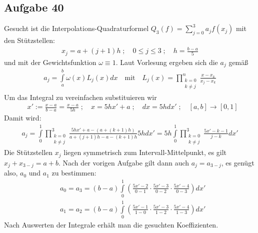 \subsection*{Aufgabe 40}
Gesucht ist die Interpolations-Quadraturformel $Q_3(f) = \sum_{j=0}^3 a_j f(x_j)$
mit den Stützstellen:
\begin{align*}
  x_j = a + (j + 1) h\;;\quad 0 \le j \le 3 \;;\quad h = \frac{b-a}{5}
\end{align*}
und mit der Gewichtsfunktion $\omega \equiv 1$. Laut Vorlesung ergeben sich die $a_j$ gemäß
\begin{align*}
  a_j = \int \limits_a^b \omega(x) L_j(x) dx \quad \text{mit} \quad
 L_j(x) = \prod_{\substack{k = 0 \\k \neq j}}^n \frac{x - x_k}{x_j - x_k}
\end{align*}
Um das Integral zu vereinfachen substituieren wir
\begin{align*}
  & x' := \frac{x - a}{b - a} = \frac{x - a}{5 h} \;;\quad x = 5 h x' + a \;;\quad dx = 5 h dx' \;;\quad
  [a,b] \rightarrow [0,1]
\end{align*}
Damit wird:
\begin{align*}
  a_j = \int \limits_0^1 \prod_{\substack{k = 0 \\k \neq j}}^3
  \frac{5 h x' + a - (a + (k+1) h)}{a + (j+1)h - a - (k+1) h } 5 h dx' =
  5 h \int \limits_0^1 \prod_{\substack{k = 0 \\k \neq j}}^3
  \frac{5 x' - k - 1}{j-k} d x'
\end{align*}
Die Stützstellen $x_j$ liegen symmetrisch zum Intervall-Mittelpunkt, es gilt
$x_j + x_{3-j} = a + b$. Nach der vorigen Aufgabe gilt dann auch $a_j = a_{3-j}$,
es genügt also, $a_0$ und $a_1$ zu bestimmen:
\begin{align*}
  & a_0 = a_3 = (b-a) \int \limits_0^1 \left(\frac{5x'-2}{0-1} \cdot \frac{5x'-3}{0-2} \cdot \frac{5x'-4}{0-3} \right) dx' \\
  & a_1 = a_2 = (b-a) \int \limits_0^1 \left(\frac{5x'-1}{1-0} \cdot \frac{5x'-3}{1-2} \cdot \frac{5x'-4}{1-3} \right) dx'
\end{align*}
Nach Auswerten der Integrale erhält man die gesuchten Koeffizienten.




